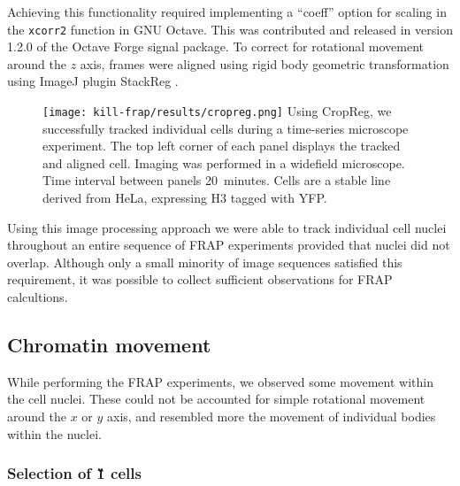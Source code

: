       Achieving this functionality required implementing a ``coeff'' option
      for scaling in the \texttt{xcorr2} function in GNU Octave.
      This was contributed and released in version 1.2.0 of the Octave Forge signal package.
      To correct for rotational movement around the $z$ axis,
      frames were aligned using rigid body geometric transformation using ImageJ plugin StackReg \citep{stackreg}.

      \begin{figure}
        \centering
        \texttt{[image: kill-frap/results/cropreg.png]}
          {
            Using CropReg, we successfully tracked individual cells during
            a time-series microscope experiment. The top left corner of each
            panel displays the tracked and aligned cell. Imaging was performed
            in a widefield microscope. Time interval between panels 20~minutes.
            Cells are a stable line derived from HeLa, expressing H3 tagged
            with YFP.
          }
        \label{fig:kill-frap:cropreg}
      \end{figure}

      Using this image processing approach we were able to track individual cell nuclei
      throughout an entire sequence of FRAP experiments  provided
      that nuclei did not overlap.
      Although only a small minority of image sequences satisfied this requirement,
      it was possible to collect sufficient observations for FRAP calcultions.

  \subsection{Chromatin movement}

    While performing the FRAP experiments, we observed some movement
    within the cell nuclei. These could not be accounted for simple rotational
    movement around the $x$ or $y$ axis, and resembled more the movement
    of individual bodies within the nuclei.

    \subsubsection{Selection of \G1{} cells}

